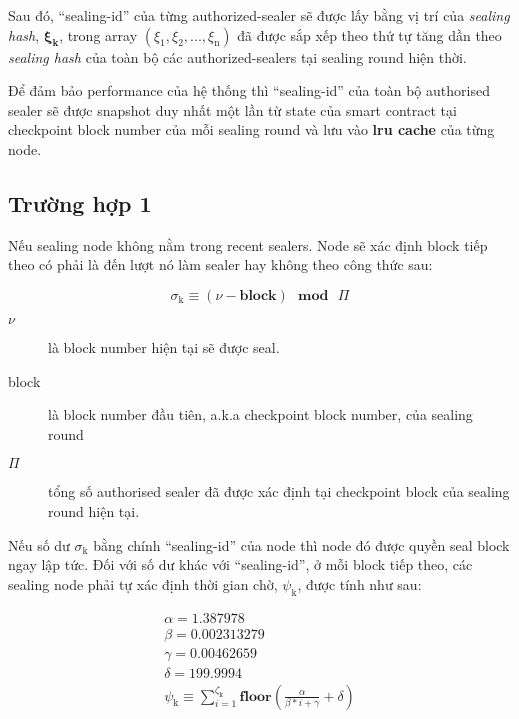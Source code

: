 \documentclass[12pt]{amsart}
\begin{document}
\begin{multicols}{2}
Sau đó, ``sealing-id'' của từng authorized-sealer sẽ được lấy bằng vị trí của \textit{sealing hash}, $\boldsymbol{\xi_k}$, trong array $(\xi_{\mathrm{1}}, \xi_{\mathrm{2}}, ..., \xi_{\mathrm{n}})$ đã được sắp xếp theo thứ tự tăng dần theo \textit{sealing hash} của toàn bộ các authorized-sealers tại sealing round hiện thời.

Để đảm bảo performance của hệ thống thì ``sealing-id'' của toàn bộ authorised sealer sẽ được snapshot duy nhất một lần từ state của smart contract tại checkpoint block number của mỗi sealing round và lưu vào \textbf{lru cache} của từng node.

\subsection{Trường hợp 1} Nếu sealing node không nằm trong recent sealers. Node sẽ xác định block tiếp theo có phải là đến lượt nó làm sealer hay không theo công thức sau:

\begin{equation}
\sigma_{\mathrm{k}} \equiv (\nu - \mathbf{block}) \ \ \ \mathbf{mod} \ \ \ \Pi
\end{equation}

\begin{description}
\item[$\nu$] là block number hiện tại sẽ được seal.
\item[block] là block number đầu tiên, a.k.a checkpoint block number, của sealing round
\item[$\Pi$] tổng số authorised sealer đã được xác định tại checkpoint block của sealing round hiện tại.
\end{description}

Nếu số dư $\sigma_{\mathrm{k}}$ bằng chính ``sealing-id'' của node thì node đó được quyền seal block ngay lập tức. Đối với số dư khác với ``sealing-id'', ở mỗi block tiếp theo, các sealing node phải tự xác định thời gian chờ, $\psi_{\mathrm{k}}$, được tính như sau:

\begin{eqnarray}
\alpha = 1.387978 \\
\beta = 0.002313279 \\
\gamma = 0.00462659 \\
\delta = 199.9994 \\
\psi_{\mathrm{k}} \equiv \sum_{i=1}^{\zeta_\mathrm{k}} \mathbf{floor}(\frac{\alpha}{\beta*i+\gamma} + \delta)
\end{eqnarray}




\end{multicols}
\end{document}
